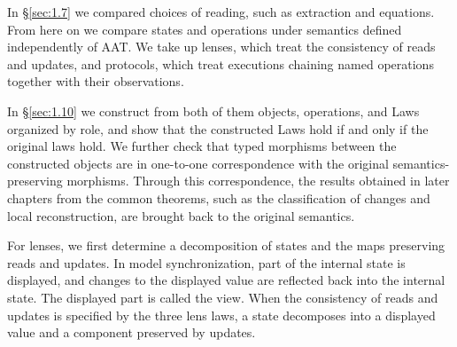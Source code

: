 In \S\ref{sec:1.7} we compared choices of reading, such as extraction and
equations.
From here on we compare states and operations under semantics defined
independently of AAT.
We take up lenses, which treat the consistency of reads and updates, and
protocols, which treat executions chaining named operations together with their
observations.

In \S\ref{sec:1.10} we construct from both of them objects, operations, and
Laws organized by role, and show that the constructed Laws hold if and only if
the original laws hold.
We further check that typed morphisms between the constructed objects are in
one-to-one correspondence with the original semantics-preserving morphisms.
Through this correspondence, the results obtained in later chapters from the
common theorems, such as the classification of changes and local
reconstruction, are brought back to the original semantics.

For lenses, we first determine a decomposition of states and the maps
preserving reads and updates.
In model synchronization, part of the internal state is displayed, and changes
to the displayed value are reflected back into the internal state.
The displayed part is called the view.
When the consistency of reads and updates is specified by the three lens laws,
a state decomposes into a displayed value and a component preserved by updates.

